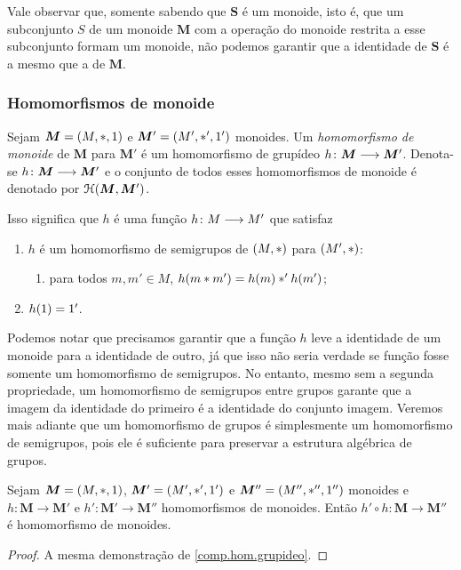 Vale observar que, somente sabendo que $\bm S$ é um monoide, isto é, que um subconjunto $S$ de um monoide $\bm M$ com a operação do monoide restrita a esse subconjunto formam um monoide, não podemos garantir que a identidade de $\bm S$ é a mesmo que a de $\bm M$.

\subsubsection{Homomorfismos de monoide}

\begin{definition}
Sejam $\bm M=(M,\ast,1)$ e $\bm M'=(M',\ast',1')$ monoides. Um \emph{homomorfismo de monoide} de $\bm M$ para $\bm M'$ é um homomorfismo de grupídeo ${h}\colon {\bm M} \longrightarrow {\bm M'}$. Denota-se ${h}\colon {\bm M} \longrightarrow {\bm M'}$ e o conjunto de todos esses homomorfismos de monoide é denotado por $\mathcal{H}(\bm M,\bm M')$.
\end{definition}

Isso significa que $h$ é uma função ${h}\colon {M} \longrightarrow {M'}$ que satisfaz
	\begin{enumerate}
	\item $h$ é um homomorfismo de semigrupos de $(M,\ast)$ para $(M',\ast)$:
		\begin{enumerate}
		\item para todos $m,m' \in M$, $h(m \ast m') = h(m) \ast' h(m')$;
		\end{enumerate}
	\item $h(1)=1'$.
	\end{enumerate}

Podemos notar que precisamos garantir que a função $h$ leve a identidade de um monoide para a identidade de outro, já que isso não seria verdade se função fosse somente um homomorfismo de semigrupos. No entanto, mesmo sem a segunda propriedade, um homomorfismo de semigrupos entre grupos garante que a imagem da identidade do primeiro é a identidade do conjunto imagem. Veremos mais adiante que um homomorfismo de grupos é simplesmente um homomorfismo de semigrupos, pois ele é suficiente para preservar a estrutura algébrica de grupos.

\begin{proposition}
\label{comp.hom.mon}
Sejam $\bm M=(M,\ast,1)$, $\bm M'=(M',\ast',1')$ e $\bm M''=(M'',\ast'',1'')$ monoides e $h: \bm M \to \bm M'$ e $h': \bm M' \to \bm M''$ homomorfismos de monoides. Então $h' \circ h: \bm M \to \bm M''$ é homomorfismo de monoides.
\end{proposition}
\begin{proof}
A mesma demonstração de \ref{comp.hom.grupideo}.
\end{proof}



